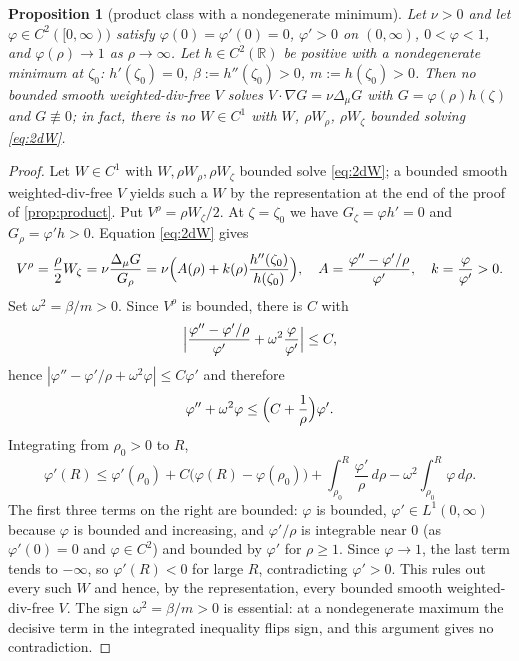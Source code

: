 \documentclass[11pt]{article}
\newtheorem{proposition}[theorem]{Proposition}
\theoremstyle{definition}
\newcommand{\R}{\mathbb{R}}
\begin{document}
\begin{proposition}[product class with a nondegenerate minimum]\label{prop:min}
Let $\nu>0$ and let $\varphi\in C^2([0,\infty))$ satisfy
$\varphi(0)=\varphi'(0)=0$,
$\varphi'>0$ on $(0,\infty)$, $0<\varphi<1$, and $\varphi(\rho)\to1$ as
$\rho\to\infty$. Let $h\in C^2(\R)$ be positive with a nondegenerate minimum at
$\zeta_0$: $h'(\zeta_0)=0$, $\beta:=h''(\zeta_0)>0$, $m:=h(\zeta_0)>0$. Then no
bounded smooth weighted-div-free $V$ solves $V\cdot\nabla G=\nu\Delta_\mu G$
with $G=\varphi(\rho)h(\zeta)$ and $G\not\equiv0$; in fact, there is no
$W\in C^1$ with $W$, $\rho W_\rho$, $\rho W_\zeta$ bounded solving
\eqref{eq:2dW}.
\end{proposition}
\begin{proof}
Let $W\in C^1$ with $W,\rho W_\rho,\rho W_\zeta$ bounded solve
\eqref{eq:2dW}; a bounded smooth weighted-div-free $V$ yields such a $W$ by the
representation at the end of the proof of \cref{prop:product}. Put
$V^\rho=\rho W_\zeta/2$.
At $\zeta=\zeta_0$ we have $G_\zeta=\varphi h'=0$ and $G_\rho=\varphi'h>0$.
Equation \eqref{eq:2dW} gives
\begin{equation}
V^\rho=\frac{\rho}{2}W_\zeta
=\nu\frac{\Delta_\mu G}{G_\rho}
=\nu\Bigl(A(\rho)+k(\rho)\frac{h''(\zeta_0)}{h(\zeta_0)}\Bigr),
\quad A=\frac{\varphi''-\varphi'/\rho}{\varphi'},\quad
k=\frac{\varphi}{\varphi'}>0.
\end{equation}
Set $\omega^2=\beta/m>0$. Since $V^\rho$ is bounded, there is $C$ with
\begin{equation}
\Bigl|\frac{\varphi''-\varphi'/\rho}{\varphi'}
+\omega^2\frac{\varphi}{\varphi'}\Bigr|\le C,
\end{equation}
hence $|\varphi''-\varphi'/\rho+\omega^2\varphi|\le C\varphi'$ and therefore
\begin{equation}
\varphi''+\omega^2\varphi\le\Bigl(C+\frac1\rho\Bigr)\varphi'.
\end{equation}
Integrating from $\rho_0>0$ to $R$,
\begin{equation}
\varphi'(R)\le\varphi'(\rho_0)+C\bigl(\varphi(R)-\varphi(\rho_0)\bigr)
+\int_{\rho_0}^R\frac{\varphi'}{\rho}\,d\rho
-\omega^2\int_{\rho_0}^R\varphi\,d\rho .
\end{equation}
The first three terms on the right are bounded: $\varphi$ is bounded,
$\varphi'\in L^1(0,\infty)$ because $\varphi$ is bounded and increasing, and
$\varphi'/\rho$ is integrable near $0$ (as $\varphi'(0)=0$ and
$\varphi\in C^2$) and bounded by $\varphi'$ for $\rho\ge1$. Since
$\varphi\to1$, the last term tends to $-\infty$, so $\varphi'(R)<0$ for large
$R$, contradicting $\varphi'>0$. This rules out every such $W$ and hence, by
the representation, every bounded smooth weighted-div-free $V$. The sign
$\omega^2=\beta/m>0$ is
essential: at a nondegenerate maximum the decisive term in the integrated
inequality flips sign, and this argument gives no contradiction.
\end{proof}
\end{document}
